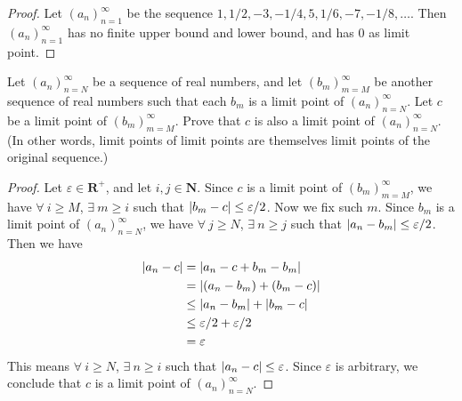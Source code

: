 \begin{proof}
    Let \((a_n)_{n = 1}^\infty\) be the sequence \(1, 1/2, -3, -1/4, 5, 1/6, -7, -1/8, \dots\).
    Then \((a_n)_{n = 1}^\infty\) has no finite upper bound and lower bound, and has \(0\) as limit point.
\end{proof}

\begin{exercise}\label{ex 6.4.10}
    Let \((a_n)_{n = N}^\infty\) be a sequence of real numbers, and let \((b_m)_{m = M}^\infty\) be another sequence of real numbers such that each \(b_m\) is a limit point of \((a_n)_{n = N}^\infty\).
    Let \(c\) be a limit point of \((b_m)_{m = M}^\infty\).
    Prove that \(c\) is also a limit point of \((a_n)_{n = N}^\infty\).
    (In other words, limit points of limit points are themselves limit points of the original sequence.)
\end{exercise}

\begin{proof}
    Let \(\varepsilon \in \mathbf{R}^+\), and let \(i, j \in \mathbf{N}\).
    Since \(c\) is a limit point of \((b_m)_{m = M}^\infty\), we have \(\forall\ i \geq M\), \(\exists\ m \geq i\) such that \(\abs*{b_m - c} \leq \varepsilon / 2\).
    Now we fix such \(m\).
    Since \(b_m\) is a limit point of \((a_n)_{n = N}^\infty\), we have \(\forall\ j \geq N\), \(\exists\ n \geq j\) such that \(\abs*{a_n - b_m} \leq \varepsilon / 2\).
    Then we have
    \begin{align*}
        \abs*{a_n - c} & = \abs*{a_n - c + b_m - b_m}           \\
                       & = \abs*{(a_n - b_m) + (b_m - c)}       \\
                       & \leq \abs*{a_n - b_m} + \abs*{b_m - c} \\
                       & \leq \varepsilon / 2 + \varepsilon / 2 \\
                       & = \varepsilon
    \end{align*}
    This means \(\forall\ i \geq N\), \(\exists\ n \geq i\) such that \(\abs*{a_n - c} \leq \varepsilon\).
    Since \(\varepsilon\) is arbitrary, we conclude that \(c\) is a limit point of \((a_n)_{n = N}^\infty\).
\end{proof}